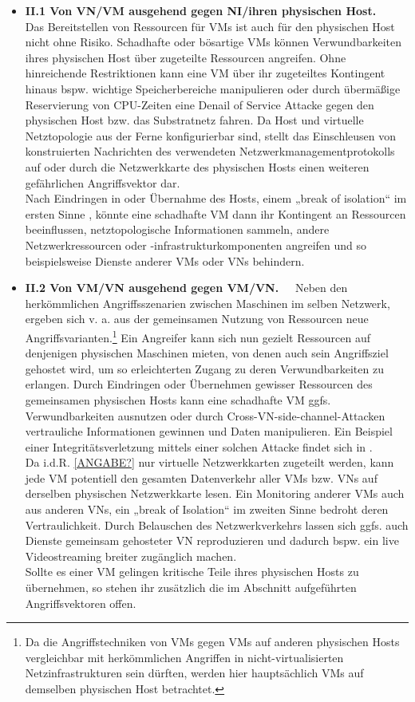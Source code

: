 \begin{itemize}
\item \textbf{II.1 Von VN/VM ausgehend gegen NI/ihren physischen Host.~~}
Das Bereitstellen von Ressourcen für VMs ist auch für den physischen Host nicht ohne Risiko. Schadhafte oder bösartige VMs können Verwundbarkeiten ihres physischen Host über zugeteilte Ressourcen angreifen. Ohne hinreichende Restriktionen kann eine VM über ihr zugeteiltes Kontingent hinaus bspw. wichtige Speicherbereiche manipulieren oder durch übermäßige Reservierung von CPU-Zeiten eine Denail of Service Attacke gegen den physischen Host bzw. das Substratnetz fahren. Da Host und virtuelle Netztopologie aus der Ferne konfigurierbar sind, stellt das Einschleusen von konstruierten Nachrichten des verwendeten Netzwerkmanagementprotokolls auf oder durch die Netzwerkkarte des physischen Hosts einen weiteren gefährlichen Angriffsvektor dar.\\
Nach Eindringen in oder Übernahme des Hosts, einem „break of isolation“ im ersten Sinne \cite{wu2010network}, könnte eine schadhafte VM dann ihr Kontingent an Ressourcen beeinflussen, netztopologische Informationen sammeln, andere Netzwerkressourcen oder -infrastrukturkomponenten angreifen und so beispielsweise Dienste anderer VMs oder VNs behindern.

\item \textbf{II.2 Von VM/VN ausgehend gegen VM/VN.~~}
Neben den herkömmlichen Angriffsszenarien zwischen Maschinen im selben Netzwerk, ergeben sich v. a. aus der gemeinsamen Nutzung von Ressourcen neue Angriffsvarianten.\footnote{Da die Angriffstechniken von VMs gegen VMs auf anderen physischen Hosts vergleichbar mit herkömmlichen Angriffen in nicht-virtualisierten Netzinfrastrukturen sein dürften, werden hier hauptsächlich VMs auf demselben physischen Host betrachtet.} 
Ein Angreifer kann sich nun gezielt Ressourcen auf denjenigen physischen Maschinen mieten, von denen auch sein Angriffsziel gehostet wird, um so erleichterten Zugang zu deren Verwundbarkeiten zu erlangen. Durch Eindringen oder Übernehmen gewisser Ressourcen des gemeinsamen physischen Hosts kann eine schadhafte VM ggfs. Verwundbarkeiten ausnutzen oder durch Cross-VN-side-channel-Attacken vertrauliche Informationen gewinnen und Daten manipulieren. Ein Beispiel einer Integritätsverletzung mittels einer solchen Attacke findet sich in \cite{ristenpart2009hey}. \\
Da i.d.R. \underline{[ANGABE?]} nur virtuelle Netzwerkkarten zugeteilt werden, kann jede VM potentiell den gesamten Datenverkehr aller VMs bzw. VNs auf derselben physischen Netzwerkkarte lesen. Ein Monitoring anderer VMs auch aus anderen VNs, ein „break of Isolation“ im zweiten Sinne bedroht deren Vertraulichkeit. Durch Belauschen des Netzwerkverkehrs lassen sich ggfs. auch Dienste gemeinsam gehosteter VN reproduzieren und dadurch bspw. ein live Videostreaming breiter zugänglich machen. \cite{natarajansecurity}\\
Sollte es einer VM gelingen kritische Teile ihres physischen Hosts zu übernehmen, so stehen ihr zusätzlich die im Abschnitt \textit{} aufgeführten Angriffsvektoren offen.



\end{itemize}
